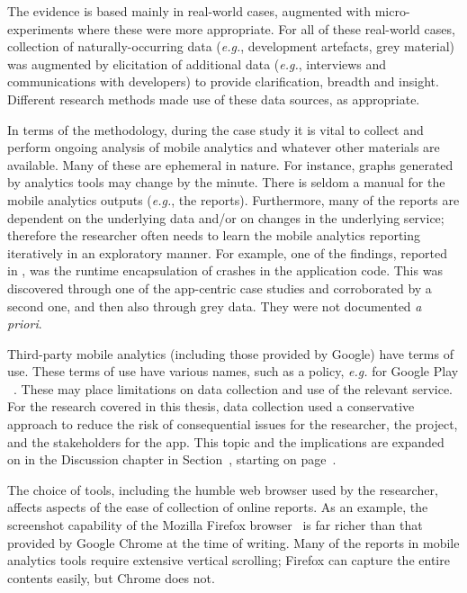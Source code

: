 The evidence is based mainly in real-world cases, augmented with micro-experiments where these were more appropriate. For all of these real-world cases, collection of naturally-occurring data (\textit{e.g.}, development artefacts, grey material) was augmented by elicitation of additional data (\textit{e.g.}, interviews and communications with developers) to provide clarification, breadth and insight.  Different research methods made use of these data sources, as appropriate.

In terms of the methodology, during the case study it is vital to collect and perform ongoing analysis of mobile analytics and whatever other materials are available. Many of these are ephemeral in nature. For instance, graphs generated by analytics tools may change by the minute. There is seldom a manual for the mobile analytics outputs (\textit{e.g.}, the reports). Furthermore, many of the reports are dependent on the underlying data and/or on changes in the underlying service; therefore the researcher often needs to learn the mobile analytics reporting iteratively in an exploratory manner. For example, one of the findings, reported in , was the runtime encapsulation of crashes in the application code. This was discovered through one of the app-centric case studies and corroborated by a second one, and then also through grey data. They were not documented \emph{a priori}. 


Third-party mobile analytics (including those provided by Google) have terms of use. These terms of use have various names, such as a policy, \textit{e.g.} for Google Play ~. These may place limitations on data collection and use of the relevant service. For the research covered in this thesis, data collection used a conservative approach to reduce the risk of consequential issues for the researcher, the project, and the stakeholders for the app. This topic and the implications are expanded on in the Discussion chapter in Section~, starting on page~\pageref{discussion-on-methodology-and-case-study-procedure}.

The choice of tools, including the humble web browser used by the researcher, affects aspects of the ease of collection of online reports. As an example, the screenshot capability of the Mozilla Firefox browser~ is far richer than that provided by Google Chrome at the time of writing. Many of the reports in mobile analytics tools require extensive vertical scrolling; Firefox can capture the entire contents easily, but Chrome does not. 

